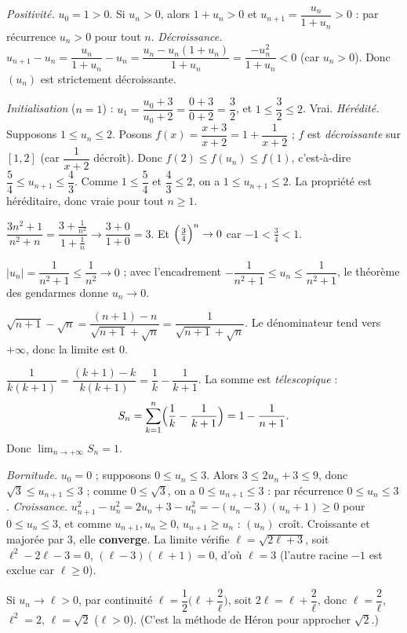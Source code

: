 \emph{Positivité.} $u_0=1>0$. Si $u_n>0$, alors $1+u_n>0$ et $u_{n+1}=\dfrac{u_n}{1+u_n}>0$ : par récurrence $u_n>0$ pour tout $n$.
\emph{Décroissance.} $u_{n+1}-u_n=\dfrac{u_n}{1+u_n}-u_n=\dfrac{u_n-u_n(1+u_n)}{1+u_n}=\dfrac{-u_n^2}{1+u_n}<0$
(car $u_n>0$). Donc $(u_n)$ est strictement décroissante.

\emph{Initialisation} ($n=1$) : $u_1=\dfrac{u_0+3}{u_0+2}=\dfrac{0+3}{0+2}=\dfrac32$, et $1\le\dfrac32\le2$. Vrai.
\emph{Hérédité.} Supposons $1\le u_n\le2$. Posons $f(x)=\dfrac{x+3}{x+2}=1+\dfrac1{x+2}$ ;
$f$ est \emph{décroissante} sur $[1,2]$ (car $\dfrac1{x+2}$ décroît). Donc
$f(2)\le f(u_n)\le f(1)$, c'est-à-dire $\dfrac54\le u_{n+1}\le\dfrac43$.
Comme $1\le\dfrac54$ et $\dfrac43\le2$, on a $1\le u_{n+1}\le2$. La propriété est héréditaire,
donc vraie pour tout $n\ge1$.

$\dfrac{3n^2+1}{n^2+n}=\dfrac{3+\frac1{n^2}}{1+\frac1n}\to\dfrac{3+0}{1+0}=3$.
Et $\Bigl(\tfrac34\Bigr)^n\to0$ car $-1<\tfrac34<1$.

$\bigl|u_n\bigr|=\dfrac{1}{n^2+1}\le\dfrac1{n^2}\to0$ ; avec l'encadrement
$-\dfrac1{n^2+1}\le u_n\le\dfrac1{n^2+1}$, le théorème des gendarmes donne $u_n\to0$.

$\sqrt{n+1}-\sqrt n=\dfrac{(n+1)-n}{\sqrt{n+1}+\sqrt n}=\dfrac1{\sqrt{n+1}+\sqrt n}$.
Le dénominateur tend vers $+\infty$, donc la limite est $0$.

$\dfrac1{k(k+1)}=\dfrac{(k+1)-k}{k(k+1)}=\dfrac1k-\dfrac1{k+1}$. La somme est \emph{télescopique} :
\[
S_n=\sum_{k=1}^{n}\Bigl(\frac1k-\frac1{k+1}\Bigr)=1-\frac1{n+1}.
\]
Donc $\displaystyle\lim_{n\to+\infty}S_n=1$.

\emph{Bornitude.} $u_0=0$ ; supposons $0\le u_n\le3$. Alors $3\le2u_n+3\le9$, donc
$\sqrt3\le u_{n+1}\le3$ ; comme $0\le\sqrt3$, on a $0\le u_{n+1}\le3$ : par récurrence $0\le u_n\le3$.
\emph{Croissance.} $u_{n+1}^2-u_n^2=2u_n+3-u_n^2=-(u_n-3)(u_n+1)\ge0$ pour $0\le u_n\le3$,
et comme $u_{n+1},u_n\ge0$, $u_{n+1}\ge u_n$ : $(u_n)$ croît. Croissante et majorée par $3$, elle
\textbf{converge}. La limite vérifie $\ell=\sqrt{2\ell+3}$, soit $\ell^2-2\ell-3=0$, $(\ell-3)(\ell+1)=0$,
d'où $\ell=3$ (l'autre racine $-1$ est exclue car $\ell\ge0$).

Si $u_n\to\ell>0$, par continuité $\ell=\dfrac12\bigl(\ell+\dfrac2\ell\bigr)$, soit
$2\ell=\ell+\dfrac2\ell$, donc $\ell=\dfrac2\ell$, $\ell^2=2$, $\ell=\sqrt2$ ($\ell>0$).
(C'est la méthode de Héron pour approcher $\sqrt2$.)

